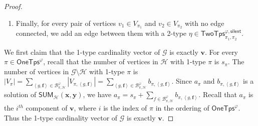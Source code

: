 \documentclass[10pt,a4paper]{article}
\theoremstyle{definition}
\theoremstyle{remark}
\newcommand{\cB}{\mathcal{B}}
\newcommand{\cG}{\mathcal{G}}
\newcommand{\cH}{\mathcal{H}}
\newcommand{\cK}{\mathsf{TwoTps}}
\newcommand{\bff}{\mathbf{f}}
\newcommand{\bfv}{\mathbf{v}}
\newcommand{\bfx}{\mathbf{x}}
\newcommand{\bfy}{\mathbf{y}}
\newcommand{\onetypes}{\mathsf{OneTps}}
\newcommand{\tuple}[1]       {\left\langle #1 \right\rangle}
\newcommand{\abs}[1]         {{\left| #1 \right|}}
\newcommand{\trif} {\triangleright}
\newcommand{\trib} {\triangleleft}
\newcommand{\cKvpnull}  {\cK^{\varphi, \mathsf{silent}}}
\newcommand{\cKvpf}     {\cK^{\varphi, \trif}}
\newcommand{\cKvpb}     {\cK^{\varphi, \trib}}
\newcommand{\summ}  {\mathsf{SUM}}
\begin{document}
\begin{proof}
\begin{enumerate}
            We apply the swapping procedure to eliminate parallel edges as well.
            Suppose that there are parallel edges $e_1$ and $e_2$
            between $v_1 \in V_{\pi_1}$ and $v_2 \in V_{\pi_2}$ with 2-types $\eta_1 \in \cKvpf_{\pi_1, \pi_2}$ for $e_1$ and $\eta_2$ for $e_2$.
            We consider two cases:
            \begin{itemize}
            \item 
                If there is a vertex $u_2 \in V_{\pi_2}$ such that there is no edges between $v_1$ and $u_2$,
                then we remove $e_1$ and add an edge between $v_1$ and $u_2$ with 2-types $\eta_1$.
            \item 
                Otherwise, suppose that there is no such $u_2$,
                which implies that for every vertex $u \in V_{\pi_2}$,
                there exists an edge $e_3$ between $v_1$ and $u$.
                Because there are at most $2K^\varphi(2K^\varphi+1)^2$ edges
                between $V_{\pi_1}$ and $V_{\pi_2}$,
                we can find $u_1 \in V_{\pi_1}$ and $u_2 \in V_{\pi_2}$
                such that no edges exists between them,
                and there exists an edge $e_3$ between $v_1$ and $u_2$ with type $\eta_3 \in \cKvpb_{\pi_1, \pi_2}$. 
                We then remove the edges $e_1$ and $e_3$
                and fresh edges $(v_1, u_2)$ with 2-type $\eta_1$ and $(v_2, u_2)$ with 2-type $\eta_3$.
            \end{itemize}
            For both cases, the swapping procedure preserves the number of edges connected to vertices with specific 2-types
            but reduces the number of parallel edges by 1,
            We can repeat it until all parallel edges are eliminated.

        \item
            Finally, for every pair of vertices $v_1 \in V_{\pi_1}$ and $v_2 \in V_{\pi_2}$ 
            with no edge connected,
            we add an edge between them with a 2-type  $\eta \in \cKvpnull_{\pi_1, \pi_2}$.
    \end{enumerate}

    We first claim that the 1-type cardinality vector of $\cG$ is exactly $\bfv$.
    For every $\pi \in \onetypes^\varphi$,
    recall that the number of vertices in $\cH$ with 1-type $\pi$ is $s_\pi$.
    The number of vertices in $\cG \setminus \cH$ with 1-type $\pi$ is
    $\abs{V_\pi} = \sum_{\tuple{g, \bff} \in \cB^\varphi_{\pi, \cH}} \abs{V_{\pi, \tuple{g, \bff}}} = \sum_{\tuple{g, \bff} \in \cB^\varphi_{\pi, \cH}} b_{\pi, \tuple{g, \bff}}$.
    Since $a_\pi$ and $b_{\pi, \tuple{g, \bff}}$ is a solution of $\summ_{\cH}(\bfx, \bfy)$,
    we have $a_\pi = s_\pi + \sum_{f \in \cB^\varphi_{\pi, \cH}} b_{\pi, \tuple{g, \bff}}$.
    Recall that $a_\pi$ is the $i^{th}$ component of $\bfv$, where $i$ is the index of $\pi$ in the  ordering of $\onetypes^\varphi$.
    Thus the 1-type cardinality vector of $\cG$ is exactly $\bfv$.


\end{proof}
\end{document}
